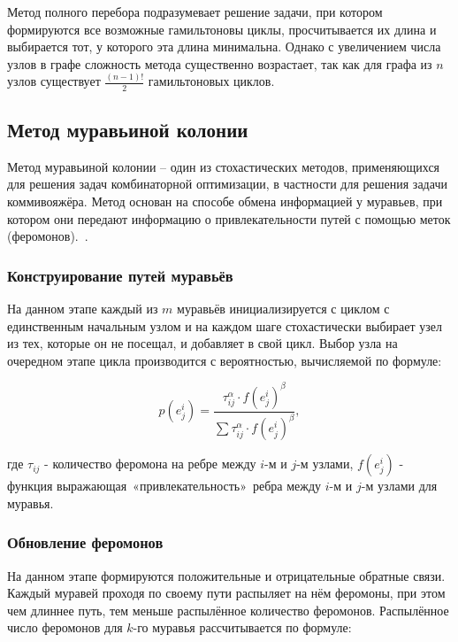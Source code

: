 Метод полного перебора подразумевает решение задачи, при котором формируются все возможные гамильтоновы циклы, просчитывается их длина и выбирается тот, у которого эта длина минимальна. Однако с увеличением числа узлов в графе сложность метода существенно возрастает, так как для графа из $n$ узлов существует $\frac{(n-1)!}{2}$ гамильтоновых циклов.~\cite{tsp}

\subsection{Метод муравьиной колонии}

Метод муравьиной колонии -- один из стохастических методов, применяющихся для решения задач комбинаторной оптимизации, в частности для решения задачи коммивояжёра. Метод основан на способе обмена информацией у муравьев, при котором они передают информацию о привлекательности путей с помощью меток (феромонов).~\cite{her}.

\subsubsection{Конструирование путей муравьёв}

На данном этапе каждый из $m$ муравьёв инициализируется с циклом с единственным начальным узлом и на каждом шаге стохастически выбирает узел из тех, которые он не посещал, и добавляет в свой цикл. Выбор узла на очередном этапе цикла производится с вероятностью, вычисляемой по формуле:

\begin{equation}
    p(e^i_j) = \frac{\tau^\alpha_{ij} \cdot f(e^i_j)^\beta}{\sum{\tau^\alpha_{ij} \cdot f(e^i_j)^\beta}},
\end{equation}

где $\tau_{ij}$ - количество феромона на ребре между $i$-м и $j$-м узлами, \newline$f(e^i_j)$ - функция выражающая~«привлекательность»~ребра между $i$-м и $j$-м узлами для муравья.
\subsubsection{Обновление феромонов}

На данном этапе формируются положительные и отрицательные обратные связи. Каждый муравей проходя по своему пути распыляет на нём феромоны, при этом чем длиннее путь, тем меньше распылённое количество феромонов. Распылённое число феромонов для $k$-го муравья рассчитывается по формуле:

